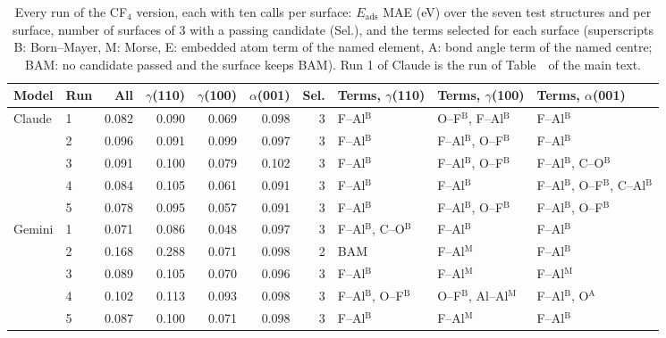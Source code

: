 \begin{table}[h]
\caption{Every run of the CF$_4$ version, each with ten calls per surface: $E_\mathrm{ads}$ MAE (eV) over the seven test structures and per surface, number of surfaces of 3 with a passing candidate (Sel.), and the terms selected for each surface (superscripts B: Born--Mayer, M: Morse, E: embedded atom term of the named element, A: bond angle term of the named centre; BAM: no candidate passed and the surface keeps BAM). Run 1 of Claude is the run of Table~\fi\ of the main text.}\label{tab:si-cf4-runs}
\scriptsize\renewcommand{\baselinestretch}{1}\selectfont
\setlength{\tabcolsep}{3pt}
\begin{tabular}{llrrrrrlll}
\toprule
Model & Run & All & $\gamma$(110) & $\gamma$(100) & $\alpha$(001) & Sel. & Terms, $\gamma$(110) & Terms, $\gamma$(100) & Terms, $\alpha$(001) \\
\midrule
Claude & 1 & 0.082 & 0.090 & 0.069 & 0.098 & 3 & F--Al$^\mathrm{B}$ & O--F$^\mathrm{B}$, F--Al$^\mathrm{B}$ & F--Al$^\mathrm{B}$ \\
 & 2 & 0.096 & 0.091 & 0.099 & 0.097 & 3 & F--Al$^\mathrm{B}$ & F--Al$^\mathrm{B}$, O--F$^\mathrm{B}$ & F--Al$^\mathrm{B}$ \\
 & 3 & 0.091 & 0.100 & 0.079 & 0.102 & 3 & F--Al$^\mathrm{B}$ & F--Al$^\mathrm{B}$, O--F$^\mathrm{B}$ & F--Al$^\mathrm{B}$, C--O$^\mathrm{B}$ \\
 & 4 & 0.084 & 0.105 & 0.061 & 0.091 & 3 & F--Al$^\mathrm{B}$ & F--Al$^\mathrm{B}$ & F--Al$^\mathrm{B}$, O--F$^\mathrm{B}$, C--Al$^\mathrm{B}$ \\
 & 5 & 0.078 & 0.095 & 0.057 & 0.091 & 3 & F--Al$^\mathrm{B}$ & F--Al$^\mathrm{B}$, O--F$^\mathrm{B}$ & F--Al$^\mathrm{B}$, O--F$^\mathrm{B}$ \\
Gemini & 1 & 0.071 & 0.086 & 0.048 & 0.097 & 3 & F--Al$^\mathrm{B}$, C--O$^\mathrm{B}$ & F--Al$^\mathrm{B}$ & F--Al$^\mathrm{B}$ \\
 & 2 & 0.168 & 0.288 & 0.071 & 0.098 & 2 & BAM & F--Al$^\mathrm{M}$ & F--Al$^\mathrm{B}$ \\
 & 3 & 0.089 & 0.105 & 0.070 & 0.096 & 3 & F--Al$^\mathrm{B}$ & F--Al$^\mathrm{M}$ & F--Al$^\mathrm{M}$ \\
 & 4 & 0.102 & 0.113 & 0.093 & 0.098 & 3 & F--Al$^\mathrm{B}$, O--F$^\mathrm{B}$ & O--F$^\mathrm{B}$, Al--Al$^\mathrm{M}$ & F--Al$^\mathrm{B}$, O$^\mathrm{A}$ \\
 & 5 & 0.087 & 0.100 & 0.071 & 0.098 & 3 & F--Al$^\mathrm{B}$ & F--Al$^\mathrm{M}$ & F--Al$^\mathrm{B}$ \\

\end{tabular}
\end{table}
